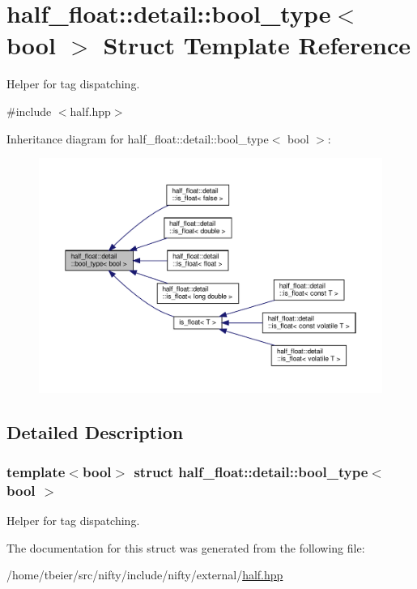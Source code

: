 \hypertarget{structhalf__float_1_1detail_1_1bool__type}{}\section{half\+\_\+float\+:\+:detail\+:\+:bool\+\_\+type$<$ bool $>$ Struct Template Reference}
\label{structhalf__float_1_1detail_1_1bool__type}


Helper for tag dispatching.  




{\ttfamily \#include $<$half.\+hpp$>$}



Inheritance diagram for half\+\_\+float\+:\+:detail\+:\+:bool\+\_\+type$<$ bool $>$\+:
\nopagebreak
\begin{figure}[H]
\begin{center}
\leavevmode
\includegraphics[width=350pt]{structhalf__float_1_1detail_1_1bool__type__inherit__graph}
\end{center}
\end{figure}


\subsection{Detailed Description}
\subsubsection*{template$<$bool$>$\newline
struct half\+\_\+float\+::detail\+::bool\+\_\+type$<$ bool $>$}

Helper for tag dispatching. 

The documentation for this struct was generated from the following file\+:\begin{DoxyCompactItemize}
\item 
/home/tbeier/src/nifty/include/nifty/external/\hyperlink{half_8hpp}{half.\+hpp}\end{DoxyCompactItemize}
